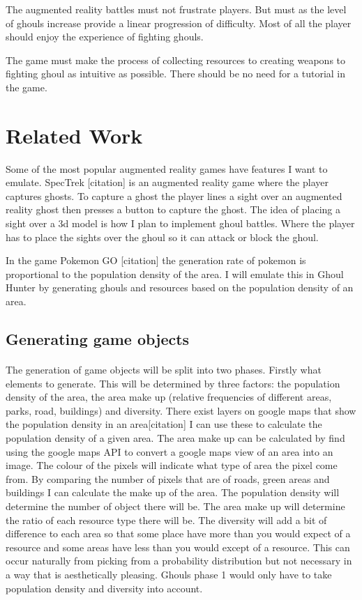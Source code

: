 \documentclass[11pt,openright,a4paper]{report}
\begin{document}
	The augmented reality battles must not frustrate players. But must as the level of ghouls increase provide a linear progression of difficulty. Most of all the player should enjoy the experience of fighting ghouls. 
	
	The game must make the process of collecting resources to creating weapons to fighting ghoul as intuitive as possible. There should be no need for a tutorial in the game. 
	
	\section{Related Work}
	Some of the most popular augmented reality games have features I want to emulate. SpecTrek [citation] is an augmented reality game where the player captures ghosts. To capture a ghost the player lines a sight over an augmented reality ghost then presses a button to capture the ghost. The idea of placing a sight over a 3d model is how I plan to implement ghoul battles. Where the player has to place the sights over the ghoul so it can attack or block the ghoul.  
	
	In the game Pokemon GO [citation] the generation rate of pokemon is proportional to the population density of the area. I will emulate this in Ghoul Hunter by generating ghouls and resources based on the population density of an area. 
	
	\subsection{Generating game objects}
		
		\paragraph{}The generation of game objects will be split into two phases. Firstly what elements to generate. This will be determined by three factors: the population density of the area, the area make up (relative frequencies of different areas, parks, road, buildings) and diversity. There exist layers on google maps that show the population density in an area[citation] I can use these to calculate the population density of a given area. The area make up can be calculated by find using the google maps API to convert a google maps view of an area into an image. The colour of the pixels will indicate what type of area the pixel come from. By comparing the number of pixels that are of roads, green areas and buildings I can calculate the make up of the area. The population density will determine the number of object there will be. The area make up will determine the ratio of each resource type there will be. The diversity will add a bit of difference to each area so that some place have more than you would expect of a resource and some areas have less than you would except of a resource. This can occur naturally from picking from a probability distribution but not necessary in a way that is aesthetically pleasing. Ghouls phase 1 would only have to take population density and diversity into account.
		
\end{document}

